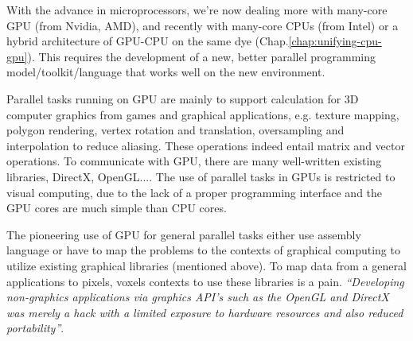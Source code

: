 With the advance in microprocessors, we're now dealing more with many-core GPU
(from Nvidia, AMD), and recently with many-core CPUs (from Intel) or a hybrid
architecture of GPU-CPU on the same dye (Chap.\ref{chap:unifying-cpu-gpu}).
This requires the development of a new, better parallel programming
model/toolkit/language that works well on the new environment.

Parallel tasks running on GPU are mainly to support calculation for 3D computer
graphics from games and graphical applications, e.g. texture mapping, polygon
rendering, vertex rotation and translation, oversampling and interpolation to
reduce aliasing. These operations indeed entail matrix and vector operations. 
To communicate with GPU, there are many well-written existing libraries,
DirectX, OpenGL....  The use of parallel tasks in GPUs is restricted to visual
computing, due to the lack of a proper programming interface and the GPU cores
are much simple than CPU cores. 

The pioneering use of GPU for general parallel tasks either use assembly
language or have to map the problems to the contexts of graphical computing to
utilize existing graphical libraries (mentioned above). To map data from a
general applications to pixels, voxels contexts to use these libraries is a pain.
{\it ``Developing non-graphics applications via graphics API's such as
  the OpenGL and DirectX was merely a hack with a limited exposure to hardware
  resources and also reduced portability''}.


